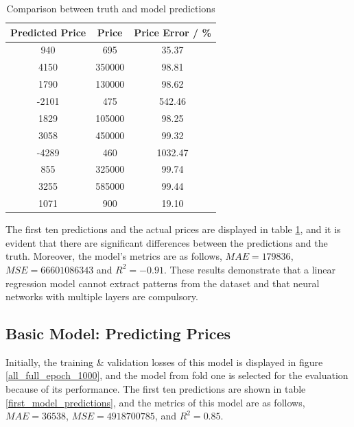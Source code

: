 \documentclass[12pt,twoside]{report}
\begin{document}
\begin{table}[!htbp]
	\centering
	\caption{Comparison between truth and model predictions}
	\label{linear_regression_predictions}
	\begin{tabular}{| c | c | c |}
		\hline
		Predicted Price & Price & Price Error  / \%\\ 
		\hline
		940 & 695 & 35.37 \\
		\hline
		4150 & 350000 & 98.81 \\
		\hline
		1790 & 130000 & 98.62 \\
		\hline
		-2101 & 475 & 542.46 \\
		\hline
		1829 & 105000 & 98.25 \\
		\hline
		3058 & 450000 & 99.32 \\
		\hline
		-4289 & 460 & 1032.47 \\
		\hline
		855 & 325000 & 99.74 \\
		\hline
		3255 & 585000 & 99.44 \\
		\hline
		1071 & 900 & 19.10 \\
		\hline
	\end{tabular}
\end{table}

The first ten predictions and the actual prices are displayed in table \ref{linear_regression_predictions}, and it is evident that there are significant differences between the predictions and the truth. Moreover, the model's metrics are as follows, $MAE = 179836$, $MSE = 66601086343$ and $R^2 = -0.91$. These results demonstrate that a linear regression model cannot extract patterns from the dataset and that neural networks with multiple layers are compulsory.

\subsection{Basic Model: Predicting Prices}
Initially, the training \& validation losses of this model is displayed in figure \ref{all_full_epoch_1000}, and the model from fold one is selected for the evaluation because of its performance. The first ten predictions are shown in table \ref{first_model_predictions}, and the metrics of this model are as follows, $MAE = 36538$, $MSE = 4918700785$, and $R^2 = 0.85$. 
\end{document}
